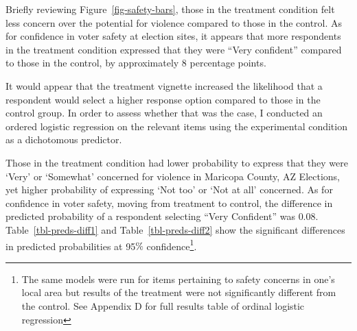 \documentclass[
  12pt,
  letterpaper,
]{article}
\begin{document}
Briefly reviewing Figure~\ref{fig-safety-bars}, those in the treatment
condition felt less concern over the potential for violence compared to
those in the control. As for confidence in voter safety at election
sites, it appears that more respondents in the treatment condition
expressed that they were ``Very confident'' compared to those in the
control, by approximately \(8\) percentage points.

It would appear that the treatment vignette increased the likelihood
that a respondent would select a higher response option compared to
those in the control group. In order to assess whether that was the
case, I conducted an ordered logistic regression on the relevant items
using the experimental condition as a dichotomous predictor.

Those in the treatment condition had lower probability to express that
they were `Very' or `Somewhat' concerned for violence in Maricopa
County, AZ Elections, yet higher probability of expressing `Not too' or
`Not at all' concerned. As for confidence in voter safety, moving from
treatment to control, the difference in predicted probability of a
respondent selecting ``Very Confident'' was \(0.08\).
Table~\ref{tbl-preds-diff1} and Table~\ref{tbl-preds-diff2} show the
significant differences in predicted probabilities at 95\(\%\)
confidence\footnote{The same models were run for items pertaining to
  safety concerns in one's local area but results of the treatment were
  not significantly different from the control. See Appendix D for full
  results table of ordinal logistic regression}.
\end{document}
